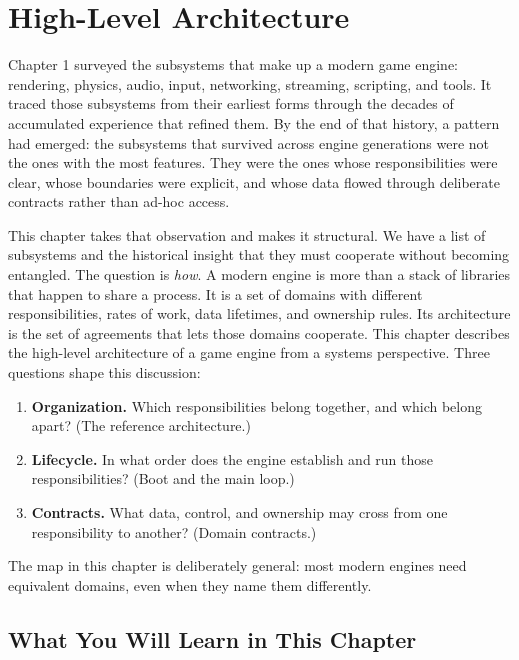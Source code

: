 \documentclass[
  11pt,
  letterpaper,
  DIV=11,
  numbers=noendperiod,
  twoside,
  open=right]{scrreprt}
\providecommand{\tightlist}{%
  \setlength{\itemsep}{0pt}\setlength{\parskip}{0pt}}
\begin{document}
\chapter{High-Level Architecture}\label{high-level-architecture}

Chapter 1 surveyed the subsystems that make up a modern game engine:
rendering, physics, audio, input, networking, streaming, scripting, and
tools. It traced those subsystems from their earliest forms through the
decades of accumulated experience that refined them. By the end of that
history, a pattern had emerged: the subsystems that survived across
engine generations were not the ones with the most features. They were
the ones whose responsibilities were clear, whose boundaries were
explicit, and whose data flowed through deliberate contracts rather than
ad-hoc access.

This chapter takes that observation and makes it structural. We have a
list of subsystems and the historical insight that they must cooperate
without becoming entangled. The question is \emph{how}. A modern engine
is more than a stack of libraries that happen to share a process. It is
a set of domains with different responsibilities, rates of work, data
lifetimes, and ownership rules. Its architecture is the set of
agreements that lets those domains cooperate. This chapter describes the
high-level architecture of a game engine from a systems perspective.
Three questions shape this discussion:

\begin{enumerate}
\def\labelenumi{\arabic{enumi}.}
\tightlist
\item
  \textbf{Organization.} Which responsibilities belong together, and
  which belong apart? (The reference architecture.)
\item
  \textbf{Lifecycle.} In what order does the engine establish and run
  those responsibilities? (Boot and the main loop.)
\item
  \textbf{Contracts.} What data, control, and ownership may cross from
  one responsibility to another? (Domain contracts.)
\end{enumerate}

The map in this chapter is deliberately general: most modern engines
need equivalent domains, even when they name them differently.

\section*{What You Will Learn in This
Chapter}\label{what-you-will-learn-in-this-chapter-1}
\end{document}
